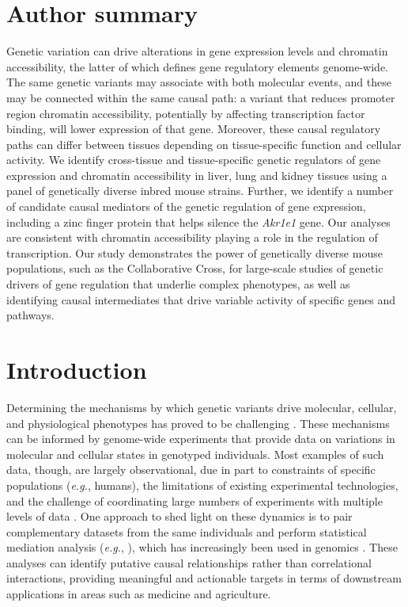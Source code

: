 \documentclass[10pt,letterpaper]{article}
\newcommand{\eg}{\emph{e.g.}\xspace}
\begin{document}
\section*{Author summary}
Genetic variation can drive alterations in gene expression levels and chromatin accessibility, the latter of which defines gene regulatory elements genome-wide. The same genetic variants may associate with both molecular events, and these may be connected within the same causal path: a variant that reduces promoter region chromatin accessibility, potentially by affecting transcription factor binding,  will lower expression of that gene. Moreover, these causal regulatory paths can differ between tissues depending on tissue-specific function and cellular activity. We identify cross-tissue and tissue-specific genetic regulators of gene expression and chromatin accessibility in liver, lung and kidney tissues using a panel of genetically diverse inbred mouse strains. Further, we identify a number of candidate causal mediators of the genetic regulation of gene expression, including a zinc finger protein that helps silence the \textit{Akr1e1} gene. Our analyses are consistent with chromatin accessibility playing a role in the regulation of transcription. Our study demonstrates the power of genetically diverse mouse populations, such as the Collaborative Cross, for large-scale studies of genetic drivers of gene regulation that underlie complex phenotypes, as well as identifying causal intermediates that drive variable activity of specific genes and pathways.

\linenumbers

\section*{Introduction}
Determining the mechanisms by which genetic variants drive molecular, cellular, and physiological phenotypes has proved to be challenging \cite{Schadt2009}. These mechanisms can be informed by genome-wide experiments that provide data on variations in molecular and cellular states in genotyped individuals. Most examples of such data, though, are largely observational, due in part to constraints of specific populations (\eg, humans), the limitations of existing experimental technologies, and the challenge of coordinating large numbers of experiments with multiple levels of data \cite{Schaid2018}. 
One approach to shed light on these dynamics is to pair complementary datasets from the same individuals and perform statistical mediation analysis (\eg, \cite{Baron1986, Mackinnon2007}), which has increasingly been used in genomics \cite{Richmond2016}. These analyses can identify putative causal relationships rather than correlational interactions, providing meaningful and actionable targets in terms of downstream applications in areas such as medicine and agriculture.
\end{document}
